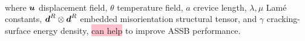 \documentclass[25pt, a0paper,
portrait,
margin=2mm, 
innermargin=2mm, 
blockverticalspace=7mm, %
colspace=2mm, %
subcolspace=0mm]{tikzposter}
\makeatletter
\newcommand*{\inputfig}[3][htb]{{
    \def\fps@figure{#1}
    \def\DIR{#2}
    \def\LABEL{#3}
    \graphicspath{{\DIR/}}
    
}}
\makeatother
\begin{document}
{\begin{minipage}{0.56\textwidth}
\begin{mdframed}
\begin{align*}
			\end{align*}
			where 
			${\boldsymbol{\mathnormal u}}$ displacement field, 
			$\theta$ temperature field, 
			$a$ crevice length,
			$\lambda, \mu$ Lam\'{e} constants,
			${\boldsymbol{\mathnormal d}}^{R}\otimes{\boldsymbol{\mathnormal d}}^{R}$ embedded misorientation structural tensor,
			and 
			$\gamma$ cracking-surface energy density,
			\colorbox{pink}{can help} to improve ASSB performance.
		\end{mdframed}
	\end{minipage}%
	\hfill
	\begin{minipage}{0.44\textwidth}
		\begin{center}
			\inputfig{floats/routine_woTV_spectral}{routine_woTV_spectral}
		\end{center}
	\end{minipage}
	\vspace{-0.3cm}
}
\end{document}
